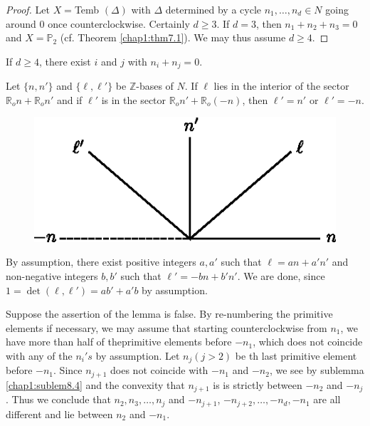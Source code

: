    \begin{proof}
Let $X=$Temb $(\Delta)$ with $\Delta$ determined by a cycle $n_1,
\ldots , n_d \in N$ going around 0 once counterclockwise. Certainly
$d \geq 3$. If $d=3$, then  $n_1 +n_2+n_3=0$ and $X=\mathbb{P}_2$
(cf. Theorem \ref{chap1:thm7.1}). We may thus assume $d \geq 4$. 
   \end{proof}  

\setcounter{lemma}{2}    
  \begin{lemma}\label{chap1:lem8.3}
If $d \geq 4$, there exist $i$ and $j$ with $n_i + n_j=0$.  
  \end{lemma}  

\setcounter{sublemma}{3}  
  \begin{sublemma}\label{chap1:sublem8.4}%
Let $\{n, n'\}$ and $\{\ell, \ell'\}$ be $\mathbb{Z}$-bases of $N$. If
$\ell$  lies in the interior of the sector $\mathbb{R}_o n+
\mathbb{R}_o n'$ and if $\ell'$ is in the sector $\mathbb{R}_o n'+
\mathbb{R}_o (-n)$, then $\ell' =n'$ or $\ell' =-n$. 

\begin{figure}[H]
\centering 
\includegraphics{vol58-fig/fig58-14.eps} 
\end{figure}
  \end{sublemma}  
  

\medskip
{}
By assumption, there exist positive integers $a, a'$ such that $\ell =
an +a'n'$ and non-negative integers $b,b'$  such that  $\ell'=-
bn+b'n'$. We are done, since $1= \det(\ell, \ell')=ab'+a'b$ by
assumption.  

\medskip
{}
Suppose the assertion  of the lemma is false. By re-numbering the
primitive elements if necessary, we may assume that starting
counterclockwise from $n_1$, we have more than half  
of the\pageoriginale primitive elements before $-n_1$, which does not
coincide with 
any of the $n_i 's$ by assumption. Let $n_j (j>2)$ be th last
primitive element before $-n_1$. Since  $n_{j+1}$ does not coincide
with $-n_1$ and $-n_2$, we see by sublemma \ref{chap1:sublem8.4} and the  convexity
that $n_{j+1}$ is  is strictly between  $-n_2$ and $-n_j$. Thus  we
conclude that $n_2, n_3, \ldots , n_j$ and  $-n_{j+1}$, $-n_{j+2}, \ldots
  , -n_d, -n_1$ are all  different and lie between $n_2$ and $-n_1$. 

